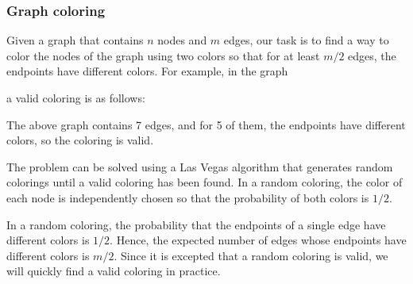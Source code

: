 \subsubsection{Graph coloring}


Given a graph that contains $n$ nodes and $m$ edges,
our task is to find a way to color the nodes
of the graph using two colors so that
for at least $m/2$ edges, the endpoints 
have different colors.
For example, in the graph
\begin{center}
\end{center}
a valid coloring is as follows:
\begin{center}
\end{center}
The above graph contains 7 edges, and for 5 of them,
the endpoints have different colors,
so the coloring is valid.

The problem can be solved using a Las Vegas algorithm
that generates random colorings until a valid coloring
has been found.
In a random coloring, the color of each node is
independently chosen so that the probability of
both colors is $1/2$.

In a random coloring, the probability that the endpoints
of a single edge have different colors is $1/2$.
Hence, the expected number of edges whose endpoints
have different colors is $m/2$.
Since it is excepted that a random coloring is valid,
we will quickly find a valid coloring in practice.

